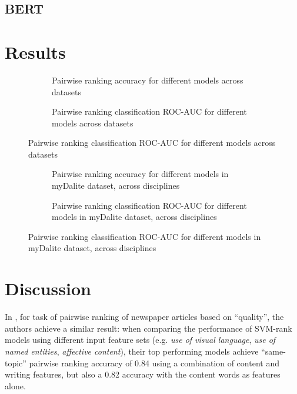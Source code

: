 \documentclass[runningheads]{llncs}
\begin{document}
\subsection{BERT}


\section{Results}


\begin{figure}
	\begin{subfigure}[t]{0.5\linewidth}
		\centering
		\scalebox{0.5}{}

		\caption{Pairwise ranking accuracy for different models across datasets}
	\end{subfigure}%
	\qquad
	\begin{subfigure}[t]{0.5\linewidth}
		\centering
		\scalebox{0.5}{}

		\caption{Pairwise ranking classification ROC-AUC for different models 
		across datasets}
	\end{subfigure}
\end{figure}


\begin{figure}
	\begin{subfigure}[t]{0.5\linewidth}
		\centering
		\scalebox{0.5}{}
		
		\caption{Pairwise ranking accuracy for different models in myDalite 
		dataset, across disciplines}
	\end{subfigure}%
	\qquad
	\begin{subfigure}[t]{0.5\linewidth}
		\centering
		\scalebox{0.5}{}
		
		\caption{Pairwise ranking classification ROC-AUC for different models 
		in myDalite dataset, across disciplines}
	\end{subfigure}
\end{figure}

\section{Discussion}

In \cite{louis_what_2013}, for task of pairwise ranking of newspaper articles 
based on ``quality'', the authors achieve a similar result: when comparing the 
performance of SVM-rank models using different input feature sets (e.g. 
\textit{use of visual language}, \textit{use of named entities}, 
\textit{affective content}), their top performing models achieve ``same-topic'' 
pairwise ranking accuracy of 0.84 using a combination of content and writing 
features, but also a 0.82 accuracy with the content words as features alone.
\end{document}

